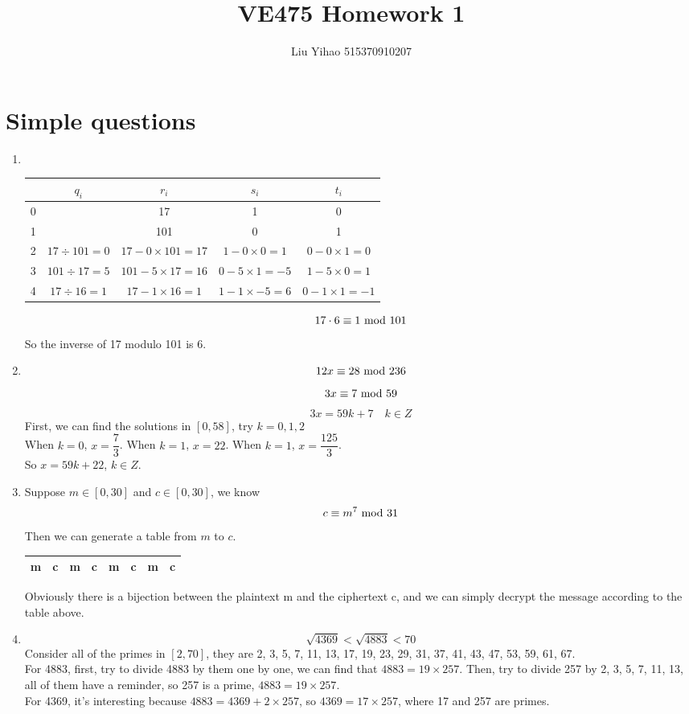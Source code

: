 \documentclass{article}
\title{VE475 Homework 1}
\author{Liu Yihao 515370910207}
\date{}
\renewcommand{\mod}{{\rm\ mod\ }}
\begin{document}
\maketitle

\section{Simple questions}
\begin{enumerate}
\item \ 
\begin{center}
\begin{tabular}{|c|c|c|c|c|}
\hline
& $q_i$ & $r_i$ & $s_i$ & $t_i$\\\hline
0 & & 17 & 1 & 0\\\hline
1 & & 101 & 0 & 1\\\hline
2 & $17\div101=0$ & $17-0\times101=17$ & $1-0\times0=1$ & $0-0\times1=0$\\\hline
3 & $101\div17=5$ & $101-5\times17=16$ & $0-5\times1=-5$ & $1-5\times0=1$\\\hline
4 & $17\div16=1$ & $17-1\times16=1$ & $1-1\times-5=6$ & $0-1\times1=-1$\\\hline
\end{tabular}
\end{center}
$$17\cdot6\equiv1\mod101$$
So the inverse of 17 modulo 101 is 6.

\item
$$12x\equiv28\mod236$$
$$3x\equiv7\mod59$$
$$3x=59k+7\quad k\in Z$$
First, we can find the solutions in $[0,58]$, try $k=0,1,2$\\
When $k=0$, $x=\dfrac{7}{3}$. When $k=1$, $x=22$. When $k=1$, $x=\dfrac{125}{3}$.\\
So $x=59k+22$, $k\in Z$.

\item
Suppose $m\in[0,30]$ and $c\in[0,30]$, we know
$$c\equiv m^7\mod 31$$
Then we can generate a table from $m$ to $c$.
\begin{center}
\begin{tabular}{cc|cc|cc|cc}
m&c&m&c&m&c&m&c\\\hline

\end{tabular}
\end{center}
Obviously there is a bijection between the plaintext m and the ciphertext c, and we can simply decrypt the message according to the table above.

\item
$$\sqrt{4369}<\sqrt{4883}<70$$
Consider all of the primes in $[2,70]$, they are 2, 3, 5, 7, 11, 13, 17, 19, 23, 29, 31, 37, 41, 43, 47, 53, 59, 61, 67.\\
For 4883, first, try to divide 4883 by them one by one, we can find that $4883=19\times 257$. Then, try to divide 257 by 2, 3, 5, 7, 11, 13, all of them have a reminder, so 257 is a prime, $4883=19\times 257$.\\
For 4369, it's interesting because $4883=4369+2\times257$, so $4369=17\times257$, where 17 and 257 are primes.


\end{enumerate}
\end{document}
